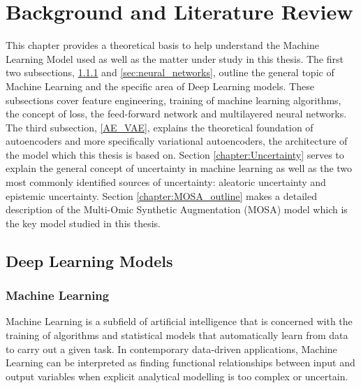
\chapter{Background and Literature Review}
\label{chapter:Background}
    
This chapter provides a theoretical basis to help understand the Machine Learning Model used as well as the matter under study in this thesis. The first two subsections, \ref{sec:machine_learning} and \ref{sec:neural_networks}, outline the general topic of Machine Learning and the specific area of Deep Learning models. These subsections cover feature engineering, training of machine learning algorithms, the concept of loss, the feed-forward network and multilayered neural networks. The third subsection, \ref{AE_VAE}, explains the theoretical foundation of autoencoders and more specifically variational autoencoders, the architecture of the model which this thesis is based on. Section \ref{chapter:Uncertainty} serves to explain the general concept of uncertainty in machine learning as well as the two most commonly identified sources of uncertainty: aleatoric uncertainty and epistemic uncertainty. Section \ref{chapter:MOSA_outline} makes a detailed description of the Multi-Omic Synthetic Augmentation (\gls{MOSA}) model which is the key model studied in this thesis.

\section{Deep Learning Models}

\subsection{Machine Learning} \label{sec:machine_learning}

Machine Learning is a subfield of artificial intelligence that is concerned with the training of algorithms and statistical models that automatically learn from data to carry out a given task.  In contemporary data-driven applications, Machine Learning can be interpreted as finding functional relationships between input  and output variables when explicit analytical modelling is too complex or uncertain.

